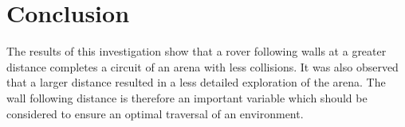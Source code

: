 \documentclass[a4paper,12pt,twocolumn]{article}
\begin{document}

\section{Conclusion}

The results of this investigation show that a rover following walls at a greater distance completes a circuit of an arena with less collisions. It was also observed that a larger distance resulted in a less detailed exploration of the arena. The wall following distance is therefore an important variable which should be considered to ensure an optimal traversal of an environment.  

\end{document}
